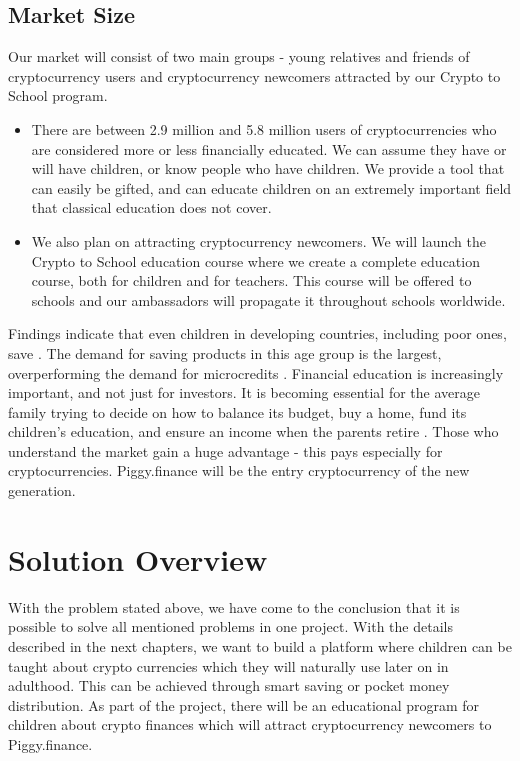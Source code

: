 \documentclass[english]{article}
\begin{document}
\subsection{Market Size}
Our market will consist of two main groups - young relatives and friends of cryptocurrency users and cryptocurrency newcomers attracted by our Crypto to School program. 

\begin{itemize}
  \item There are between 2.9 million and 5.8 million users of cryptocurrencies \cite{cryptousers} who are considered more or less financially educated. We can assume they have or will have children, or know people who have children. We provide a tool that can easily be gifted, and can educate children on an extremely important field that classical education does not cover. 
  \item We also plan on attracting cryptocurrency newcomers. We will launch the Crypto to School education course where we create a complete education course, both for children and for teachers. This course will be offered to schools and our ambassadors will propagate it throughout schools worldwide.
\end{itemize}

Findings indicate that even children in developing countries, including poor ones, save \cite{callforsavings}. The demand for saving products in this age group is the largest, overperforming the demand for microcredits \cite{callforsavings}. Financial education is increasingly important, and not just for investors. It is becoming essential for the average family trying to decide on how to balance its budget, buy a home, fund its children’s education, and ensure an income when the parents retire \cite{oecd}. Those who understand the market gain a huge advantage - this pays especially for cryptocurrencies. Piggy.finance will be the entry cryptocurrency of the new generation.

\section{Solution Overview}

With the problem stated above, we have come to the conclusion that it is possible to solve all mentioned problems in one project. With the details described in the next chapters, we want to build a platform where children can be taught about crypto currencies which they will naturally use  later on in adulthood. This can be achieved through smart saving or pocket money distribution. As part of the project, there will be an educational program for children about crypto finances which will attract cryptocurrency newcomers to Piggy.finance.
\end{document}
